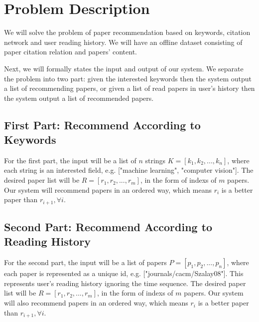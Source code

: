 \section{Problem Description}
%
We will solve the problem of paper recommendation based on keywords, citation network and user reading history. 
We will have an offline dataset consisting of paper citation relation and papers' content.

Next, we will formally states the input and output of our system. We separate the problem into two part: given the interested keywords then the system output a list of recommending papers, or given a list of read papers in user's history then the system output a list of recommended papers. 

\subsection{First Part: Recommend According to Keywords}

For the first part, the input will be a list of $n$ strings $K = [k_1, k_2, ..., k_n]$, where each string is an interested field, e.g. ["machine learning", "computer vision"]. The desired paper list will be $R = [r_1, r_2, ..., r_m]$, in the form of indexs of $m$ papers. Our system will recommend papers in an ordered way, which means $r_i$ is a better paper than $r_{i+1}, \forall i$.

\subsection{Second Part: Recommend According to Reading History}

For the second part, the input will be a list of papers $P = [p_1, p_2, ..., p_n]$, where each paper is represented as a unique id, e.g. ["journals/cacm/Szalay08"]. This represents user's reading history ignoring the time sequence. The desired paper list will be $R =  [r_1, r_2, ..., r_m]$, in the form of indexs of $m$ papers. Our system will also recommend papers in an ordered way, which means $r_i$ is a better paper than $r_{i+1}, \forall i$.

